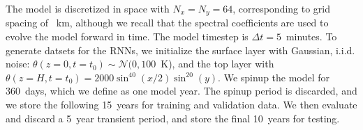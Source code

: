 
The model is discretized in space with $N_x = N_y = 64$, corresponding to
grid spacing of ~km, although we recall that the spectral coefficients
are used to evolve the model forward in time.
The model timestep is $\Delta t=5$~minutes.
To generate datsets for the RNNs, we initialize the surface layer with Gaussian,
i.i.d. noise: $\theta(z=0, t=t_0) \sim \mathcal{N}(0, 100$~K), and the top layer
with $\theta(z=H, t=t_0) = 2000 \sin^{40}(x/2)\sin^{20}(y)$.
We spinup the model for 360~days, which we define as one model year.
The spinup period is discarded, and we store the following 15~years for training
and validation data.
We then evaluate and discard a 5~year transient period, and store the final
10~years for testing.
